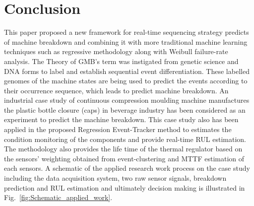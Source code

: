 \documentclass[conference]{IEEEtran}
\begin{document}
\section{Conclusion}
\label{sec:conclusion}
This paper proposed a new framework for real-time sequencing strategy predicts of machine breakdown and combining it with more traditional machine learning techniques such as regressive methodology along with Weibull failure-rate analysis. The Theory of GMB’s term was instigated from genetic science and DNA forms to label and establish sequential event differentiation. These labelled genomes of the machine states are being used to predict the events according to their occurrence sequence, which leads to predict machine breakdown. An industrial case study of continuous compression moulding machine manufactures the plastic bottle closure (caps) in beverage industry has been considered as an experiment to predict the machine breakdown. This case study also has been applied in the proposed Regression Event-Tracker method to estimates the condition monitoring of the components and provide real-time RUL estimation. The methodology also provides the life time of the thermal regulator based on the sensors’ weighting obtained from event-clustering and MTTF estimation of each sensors. A schematic of the applied research work process on the case study including the data acquisition system, two raw sensor signals, breakdown prediction and RUL estimation and ultimately decision making is illustrated in Fig.~\ref{fig:Schematic_applied_work}.
\end{document}
